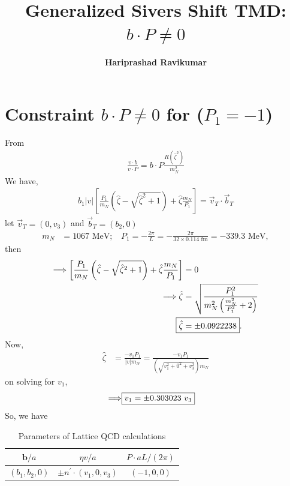 \documentclass[]{article}
\title{Generalized Sivers Shift TMD: $b\cdot P \neq 0$}
\author{\textbf{Hariprashad Ravikumar}}
\date{}
\numberwithin{equation}{section}
\newcommand{\tcdot}{{\cdot}}
\newcommand{\vect}[1]{\ensuremath{\boldsymbol{#1}}}
\newcommand{\bvec}{b}
\newcommand{\mN}{m_N}
\newcommand{\zetahat}{{\hat \zeta}}
\begin{document}
	\maketitle
\tableofcontents
\section{ Constraint $b\cdot P \neq 0$ for ($P_1=-1$)}
From
\begin{align}
    \frac{v \tcdot b}{v \tcdot P} = b \tcdot P \frac{R(\zetahat^2)}{\mN^2}
\end{align}
We have,
\begin{align}
    b_{1}|v|\left[\frac{P_{1}}{m_{N}}\left(\hat{\zeta}-\sqrt{\hat{\zeta}^2+1}\right)+\hat{\zeta}\frac{m_{N}}{P_{1}}\right]=\vec{v}_{T}\cdot\vec{b}_{T}
\end{align}
let $\vec{v}_{T}=(0,v_{3})$ and $\vec{b}_{T}=(b_{2},0)$
\begin{align}
    \mN &= 1067\text{ MeV};~~~~P_{1}=-\frac{2\pi}{L}=-\frac{2\pi}{32\times 0.114\text{ fm}}=-339.3\text{ MeV},
\end{align}
then
\begin{align}
   \Longrightarrow \left[\frac{P_{1}}{m_{N}}\left(\hat{\zeta}-\sqrt{\hat{\zeta}^2+1}\right)+\hat{\zeta}\frac{m_{N}}{P_{1}}\right]&=0\\
    \Longrightarrow \hat{\zeta} &=\sqrt{\frac{P_{1}^2}{m_{N}^{2}\left(\frac{m_{N}^{2}}{P_{1}^{2}}+2\right)}}\\
    \Aboxed{\hat{\zeta} &= \pm 0.0922238}.
\end{align}
Now,
\begin{align}
    \hat{\zeta}&=\frac{-v_{1}P_{1}}{|v|\mN}=\frac{-v_{1}P_{1}}{\left(\sqrt{v_{1}^{2}+0^{2}+v_{3}^{2}}\right)m_{N}}
\end{align}
on solving for $v_{1}$,
\begin{align}
    \Longrightarrow\Aboxed{v_{1}=\pm 0.303023~v_{3}}
\end{align}
So, we have
\begin{table}[h!]
    \centering
    \begin{tabular}{|c|c|c|}
    \hline
       $\vect{\bvec}/a$  &  $\eta v/a$ & $P\cdot aL/(2\pi)$\\
       \hline
        $(b_{1},b_{2},0)$ & $\pm n^{\prime}\cdot(v_{1},0,v_{3})$  & $(-1,0,0)$\\
        \hline
    \end{tabular}
    \caption{Parameters of Lattice QCD calculations}
    \label{tab:my_label}
\end{table}
\end{document}
